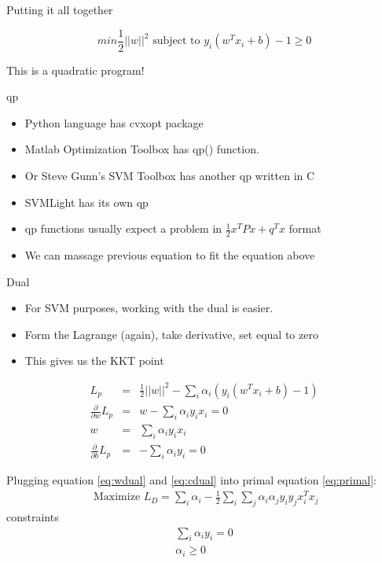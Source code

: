 \documentclass[12pt,fleqn]{article}
\begin{document}
Putting it all together

\begin{equation}
  min \frac{1}{2}{||w||^2} \textrm{ subject to }  y_{i}(w^Tx_{i}+b)-1 \ge 0 \nonumber
\end{equation}

This is a quadratic program!

qp

\begin{itemize}
   \item Python language has cvxopt package
   \item Matlab Optimization Toolbox has qp() function.
   \item Or Steve Gunn's SVM Toolbox has another qp written in C
   \item SVMLight has its own qp
   \item qp functions usually expect a problem in $\frac{1}{2}x^{T}Px+q^{T}x$
   format
   \item We can massage previous equation to fit the equation above
\end{itemize}


Dual

\begin{itemize}
   \item For SVM purposes, working with the dual  is easier.
   \item Form the Lagrange (again), take derivative, set equal to zero
   \item This gives us the KKT point
\end{itemize}

\begin{eqnarray}
L_{p} &=& \frac{1}{2}||w||^{2}-\sum_{i}\alpha_{i}(y_{i}(w^{T}x_{i}+b)-1)  \label{eq:primal}\\
\frac{\partial}{\partial w} L_{p} &=& w-\sum_{i}\alpha_{i}y_{i}x_{i}=0 \nonumber \\
w &=& \sum_{i}\alpha_{i}y_{i}x_{i} \label{eq:wdual} \\
\frac{\partial}{\partial b} L_{p} &=& -\sum_{i}\alpha_{i}y_{i}=0  \label{eq:cdual}
\end{eqnarray}

Plugging equation \ref{eq:wdual} and \ref{eq:cdual} into primal equation \ref{eq:primal}:
\begin{eqnarray}
\textrm{ Maximize } L_{D}=\sum_{i}\alpha_{i}-\frac{1}{2}\sum_{i}\sum_{j}\alpha_{i}\alpha_{j}y_{i}y_{j}x_{i}^{T}x_{j} \label{eq:svm}
\end{eqnarray}
constraints
\begin{eqnarray*}
\sum_{i}\alpha_{i}y_{i}=0 \nonumber \\
\alpha_{i} \geq 0 \nonumber
\end{eqnarray*}
\end{document}
